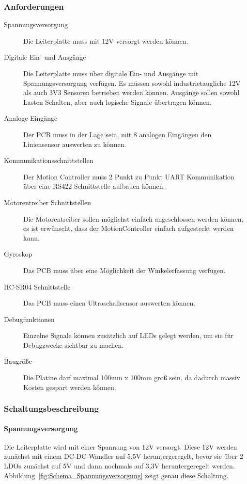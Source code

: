\documentclass[main.  tex]{subfiles} %
\begin{document}
\subsubsection*{Anforderungen}

\begin{description}
    \item[Spannungsversorgung] Die Leiterplatte muss mit 12V versorgt werden können.
    \item[Digitale Ein- und Ausgänge] Die Leiterplatte muss über digitale Ein- und
          Ausgänge mit Spannungsversorgung verfügen. Es müssen sowohl industrietaugliche
          12V als auch 3V3 Sensoren betrieben werden können. Ausgänge sollen sowohl
          Lasten Schalten, aber auch logische Signale übertragen können.
    \item[Analoge Eingänge] Der PCB muss in der Lage sein, mit 8 analogen Eingängen den
          Liniensensor auswerten zu können.
    \item[Kommunikationsschnittstellen] Der Motion Controller muss 2 Punkt zu Punkt UART
          Kommunikation über eine RS422 Schnittstelle aufbauen können.
    \item[Motorentreiber Schnittstellen] Die Motorentreiber sollen möglichst einfach
          angeschlossen werden können, es ist erwünscht, dass der MotionController
          einfach aufgesteckt werden kann.
    \item[Gyroskop] Das PCB muss über eine Möglichkeit der Winkelerfassung verfügen.
    \item[HC-SR04 Schnittstelle] Das PCB muss einen Ultraschallsensor auswerten können.
    \item[Debugfunktionen] Einzelne Signale können zusätzlich auf LEDs gelegt werden, um
          sie für Debugzwecke sichtbar zu machen.
    \item[Baugröße] Die Platine darf maximal 100mm x 100mm groß sein, da dadurch massiv
          Kosten gespart werden können.
\end{description}

\subsubsection*{Schaltungsbeschreibung}

\paragraph{Spannungsversorgung}

Die Leiterplatte wird mit einer Spannung von 12V versorgt. Diese 12V werden
zunächst mit einem DC-DC-Wandler auf 5,5V heruntergeregelt, bevor sie über 2
LDOs zunächst auf 5V und dann nochmals auf 3,3V heruntergeregelt werden.
Abbildung~\ref{fig:Schema_Spannungsversorgung} zeigt genau diese Schaltung.
\end{document}
